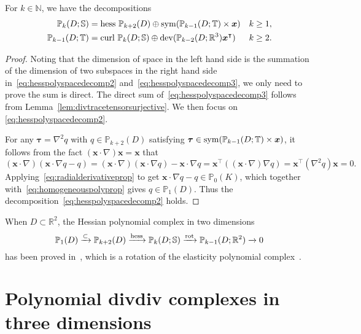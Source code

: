 \begin{lemma}
For $k\in \mathbb N$, we have the decompositions
\begin{align}\label{eq:hesspolyspacedecomp2}
\mathbb P_{k}(D;\mathbb S) &=\operatorname{hess}\, \mathbb P_{k+2}(D)\oplus\operatorname{sym}(\mathbb P_{k-1}(D;\mathbb T)\times\boldsymbol x) & k\geq 1,\\
\label{eq:hesspolyspacedecomp3}
\mathbb P_{k-1}(D;\mathbb T) &=\operatorname{curl} \, \mathbb P_{k}(D;\mathbb S)\oplus\operatorname{dev}(\mathbb P_{k-2}(D;\mathbb R^3)\boldsymbol x^{\intercal}) & k\geq 2.
\end{align}
\end{lemma}
\begin{proof}
Noting that the dimension of space in the left hand side is the summation of the dimension of two subspaces in the right hand side in~\eqref{eq:hesspolyspacedecomp2} and~\eqref{eq:hesspolyspacedecomp3}, we only need to prove the sum is direct. The direct sum of~\eqref{eq:hesspolyspacedecomp3} follows from Lemma~\ref{lem:divtracetensorsurjective}. We then focus on \eqref{eq:hesspolyspacedecomp2}.

For any $\boldsymbol\tau=\nabla^2q$ with $q\in\mathbb P_{k+2}(D)$ satisfying $\boldsymbol\tau\in\operatorname{sym}(\mathbb P_{k-1}(D;\mathbb T)\times\boldsymbol x)$, it follows from the fact $(\boldsymbol x\cdot\nabla)\boldsymbol x=\boldsymbol x$ that
\[
(\boldsymbol x\cdot\nabla)(\boldsymbol x\cdot\nabla q-q)=(\boldsymbol x\cdot\nabla)(\boldsymbol x\cdot\nabla q)-\boldsymbol x\cdot\nabla q=\boldsymbol x^{\intercal}((\boldsymbol x\cdot\nabla)\nabla q)=\boldsymbol x^{\intercal}(\nabla^2q)\boldsymbol x=0.
\]
Applying~\eqref{eq:radialderivativeprop} to get $\boldsymbol x\cdot\nabla q-q\in\mathbb P_0(K)$, which together with~\eqref{eq:homogeneouspolyprop} gives $q\in\mathbb P_{1}(D)$. Thus the decomposition~\eqref{eq:hesspolyspacedecomp2} holds.
\end{proof}

When $D\subset\mathbb R^2$,
the Hessian polynomial complex in two dimensions
\begin{equation}\label{eq:hesscomplex2dPoly}
\mathbb P_{1}(D)\xrightarrow{\subset} \mathbb P_{k+2}(D)\xrightarrow{\operatorname{hess}} \mathbb P_{k}(D;\mathbb S) \xrightarrow{{\operatorname*{rot}}} \mathbb P_{k-1}(D;\mathbb R^2)\xrightarrow{}0
\end{equation}
has been proved in~\cite{ChenHuang2020}, which is a rotation of the elasticity polynomial complex~\cite{ArnoldWinther2002}.


\section{Polynomial divdiv complexes in three dimensions}\label{sec:polycomplex}

